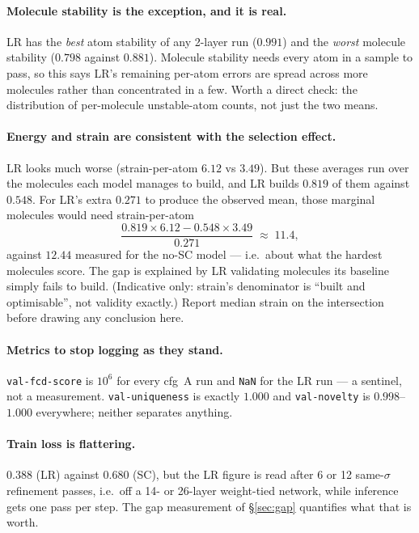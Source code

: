 \documentclass[11pt,a4paper]{article}
\newcommand{\code}[1]{\texttt{#1}}
\begin{document}
\paragraph{Molecule stability is the exception, and it is real.} LR has the \emph{best}
atom stability of any 2-layer run ($0.991$) and the \emph{worst} molecule stability
($0.798$ against $0.881$). Molecule stability needs every atom in a sample to pass, so
this says LR's remaining per-atom errors are spread across more molecules rather than
concentrated in a few. Worth a direct check: the distribution of per-molecule unstable-atom
counts, not just the two means.

\paragraph{Energy and strain are consistent with the selection effect.} LR looks much
worse (strain-per-atom $6.12$ vs $3.49$). But these averages run over the molecules each
model manages to build, and LR builds $0.819$ of them against $0.548$. For LR's extra
$0.271$ to produce the observed mean, those marginal molecules would need
strain-per-atom
\[
  \frac{0.819\times 6.12 - 0.548\times 3.49}{0.271} \;\approx\; 11.4,
\]
against $12.44$ measured for the no-SC model --- i.e.\ about what the hardest molecules
score. The gap is explained by LR validating molecules its baseline simply fails to
build. (Indicative only: strain's denominator is ``built and optimisable'', not validity
exactly.) Report median strain on the intersection before drawing any conclusion here.

\paragraph{Metrics to stop logging as they stand.} \code{val-fcd-score} is $10^6$ for
every cfg~A run and \code{NaN} for the LR run --- a sentinel, not a measurement.
\code{val-uniqueness} is exactly $1.000$ and \code{val-novelty} is $0.998$--$1.000$
everywhere; neither separates anything.

\paragraph{Train loss is flattering.} $0.388$ (LR) against $0.680$ (SC), but the LR
figure is read after 6 or 12 same-$\sigma$ refinement passes, i.e.\ off a 14- or
26-layer weight-tied network, while inference gets one pass per step. The gap
measurement of \S\ref{sec:gap} quantifies what that is worth.
\end{document}
